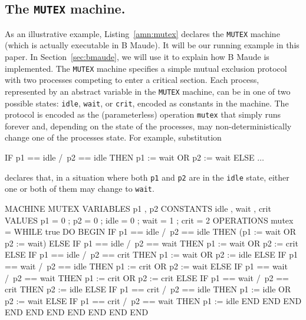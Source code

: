 \documentclass[a4paper,openany]{book}
\begin{document}
\subsection{The \texttt{MUTEX} machine.}

As an illustrative example, Listing~\ref{amn:mutex} declares the \texttt{MUTEX} machine (which is actually executable in B Maude). It will be our running example in this paper. In Section~\ref{sec:bmaude}, we will use it to explain how B Maude is implemented. The \texttt{MUTEX} machine specifies a simple mutual exclusion protocol with two processes competing to enter a critical section. Each process, represented by an abstract variable in the \texttt{MUTEX} machine, can be in one of two possible states: \texttt{idle}, \texttt{wait}, or \texttt{crit}, encoded as constants in the machine. The protocol is encoded as the (parameterless) operation \texttt{mutex} that simply runs forever and, depending on the state of the processes, may non-deterministically change one of the processes state. For example, substitution 

{\begin{amn}
IF p1 == idle /\ p2 == idle THEN p1 := wait OR p2 := wait ELSE $\ldots$
\end{amn}}

\noindent declares that, in a situation where both \texttt{p1} and \texttt{p2} are in the \texttt{idle} state, either one or both of them may change to \texttt{wait}. 

\begin{amn}[caption=\texttt{MUTEX} protocol in the Abstract Machine Notation, label=amn:mutex]
MACHINE MUTEX
  VARIABLES p1 , p2
  CONSTANTS idle , wait , crit
  VALUES
    p1 = 0 ; p2 = 0 ;
    idle = 0 ; wait = 1 ; crit = 2
  OPERATIONS
    mutex =
      WHILE true DO
      BEGIN
				IF p1 == idle /\ p2 == idle 
				THEN (p1 := wait OR p2 := wait) 
				ELSE IF p1 == idle /\ p2 == wait 
				THEN p1 := wait OR p2 := crit
				ELSE IF p1 == idle /\ p2 == crit 
				THEN p1 := wait OR p2 := idle 
				ELSE IF p1 == wait /\ p2 == idle 
				THEN p1 := crit OR p2 := wait
				ELSE IF p1 == wait /\ p2 == wait 
				THEN p1 := crit OR p2 := crit 
				ELSE IF p1 == wait /\ p2 == crit 
				THEN p2 := idle 
				ELSE IF p1 == crit /\ p2 == idle 
				THEN p1 := idle OR p2 := wait 
				ELSE IF p1 == crit /\ p2 == wait 
				THEN p1 := idle 
				END END END END END END END END
			END
END
\end{amn}
\end{document}
